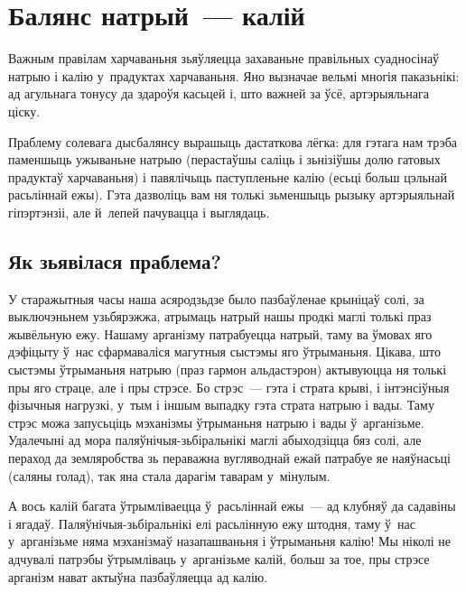 \chapter{Балянс натрый~--- калій}

Важным правілам харчаваньня зьяўляецца захаваньне правільных суадносінаў натрыю  і калію  у~прадуктах харчаваньня. Яно вызначае вельмі многія паказьнікі: ад агульнага тонусу да здароўя касьцей і, што важней за ўсё, артэрыяльнага ціску.

Праблему солевага дысбалянсу вырашыць дастаткова лёгка: для гэтага нам трэба паменшыць ужываньне натрыю (перастаўшы саліць і зьнізіўшы долю гатовых прадуктаў харчаваньня) і павялічыць паступленьне калію (есьці больш цэльнай расьліннай ежы). Гэта дазволіць вам ня толькі зьменшыць рызыку артэрыяльнай гіпэртэнзіі, але й~лепей пачувацца і выглядаць.

\section{Як зьявілася праблема?}

У старажытныя часы наша асяродзьдзе было пазбаўленае крыніцаў солі, за выключэньнем узьбярэжжа, атрымаць натрый нашы продкі маглі толькі праз жывёльную ежу. Нашаму арганізму патрабуецца натрый, таму ва ўмовах яго дэфіцыту ў~нас сфармаваліся магутныя сыстэмы яго ўтрыманьня. Цікава, што сыстэмы ўтрыманьня натрыю (праз гармон альдастэрон) актывуюцца ня толькі пры яго страце, але і пры стрэсе. Бо стрэс~--- гэта і страта крыві, і інтэнсіўныя фізычныя нагрузкі, у~тым і іншым выпадку  гэта страта натрыю і вады. Таму стрэс можа запусьціць мэханізмы ўтрыманьня натрыю і вады ў~арганізьме. Удалечыні ад мора паляўнічыя-зьбіральнікі маглі абыходзіцца бяз солі, але пераход да земляробства зь пераважна вугляводнай ежай патрабуе яе наяўнасьці (саляны голад), так яна стала дарагім таварам у~мінулым.

А вось калій багата ўтрымліваецца ў~расьліннай ежы~--- ад клубняў да садавіны і ягадаў. Паляўнічыя-зьбіральнікі елі расьлінную ежу штодня, таму ў~нас у~арганізьме няма мэханізмаў назапашваньня і ўтрыманьня калію! Мы ніколі не адчувалі патрэбы ўтрымліваць у~арганізьме калій, больш за тое, пры стрэсе арганізм нават актыўна пазбаўляецца ад калію.


